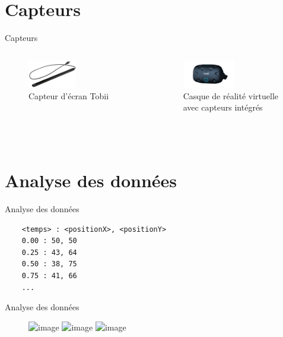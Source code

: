 \documentclass{beamer}
\begin{document}
\section{Capteurs}
\begin{frame}{Capteurs}
  \begin{columns}
    \begin{figure}
      \includegraphics[height=0.35\textwidth]{tobii.jpeg}
      \caption{Capteur d'écran Tobii}
    \end{figure}
    \begin{figure}
      \includegraphics[height=0.35\textwidth]{htcvive.png}
      \caption{Casque de réalité virtuelle avec capteurs intégrés}
    \end{figure}
  \end{columns}
\end{frame}
\section{Analyse des données}
\begin{frame}[fragile]{Analyse des données}
  \begin{lstlisting}
    <temps> : <positionX>, <positionY>
    0.00 : 50, 50
    0.25 : 43, 64
    0.50 : 38, 75
    0.75 : 41, 66
    ...
  \end{lstlisting}
\end{frame}
\begin{frame}{Analyse des données}
  \begin{figure}
    \includegraphics<1>[height=0.5\textwidth]{raw.png}
    \includegraphics<2>[height=0.5\textwidth]{sequence.png}
    \includegraphics<3>[height=0.5\textwidth]{heatmap.png}
    \caption{
    }
  \end{figure}
\end{frame}
\end{document}
